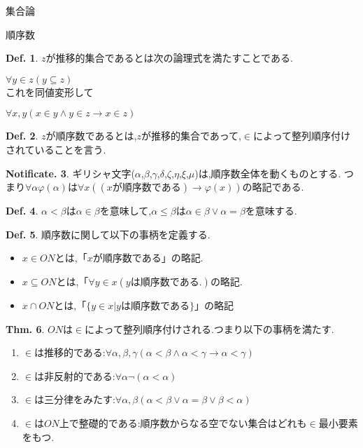 \documentclass[14pt]{jsarticle}
\theoremstyle{definition}
\newtheorem{dfn}{Def.}[subsection]
\newtheorem{thm}[dfn]{Thm.}
\newtheorem{noti}[dfn]{Notificate.}
\begin{document}
\begin{section}{集合論}
\clearpage
\begin{subsection}{順序数}
\begin{dfn}
\label{transitiondef}
$z$が推移的集合であるとは次の論理式を満たすことである.\par
$\forall y \in z(y\subseteq z)$\\
これを同値変形して\par
$\forall x,y(x\in y \land y \in z \to x\in z)$
\end{dfn}
\begin{dfn}
\label{orderd}
$z$が順序数であるとは,$z$が推移的集合であって,$\in$によって整列順序付けされていることを言う.
\end{dfn}
\begin{noti}
\label{orderchar}
ギリシャ文字($\alpha$,$\beta$,$\gamma$,$\delta$,$\zeta$,$\eta$,$\xi$,$\mu$)は,順序数全体を動くものとする.
つまり$\forall \alpha \varphi(\alpha)$は$\forall x((xが順序数である)\to \varphi(x))$の略記である.
\end{noti}
\begin{dfn}
\label{inandsmaller}
$\alpha < \beta$は$\alpha \in \beta$を意味して,$\alpha \leq \beta$は$\alpha\in\beta\lor\alpha =\beta$を意味する.
\end{dfn}
\begin{dfn}
\label{ONdef}
順序数に関して以下の事柄を定義する.
\begin{itemize}
	\item $x\in ON$とは,「$x$が順序数である」の略記.
	\item $x\subseteq ON$とは,「$\forall y \in x(yは順序数である.)$の略記.
	\item $x\cap ON$とは,「$\{y\in x| yは順序数である\}$」の略記
\end{itemize}
\end{dfn}
\begin{thm}
\label{ordernumberiswell-order}
$ON$は$\in$によって整列順序付けされる.つまり以下の事柄を満たす.
\begin{enumerate}
	\item $\in$は推移的である:$\forall \alpha,\beta,\gamma(\alpha<\beta\land\alpha<\gamma\to\alpha<\gamma)$
	\item $\in$は非反射的である:$\forall \alpha\lnot(\alpha < \alpha)$
	\item $\in$は三分律をみたす:$\forall \alpha,\beta(\alpha < \beta \lor \alpha = \beta \lor \beta < \alpha)$
	\item $\in$は$ON$上で整礎的である:順序数からなる空でない集合はどれも$\in$最小要素をもつ.
\end{enumerate}

\end{thm}
\end{subsection}
\end{section}
\end{document}
